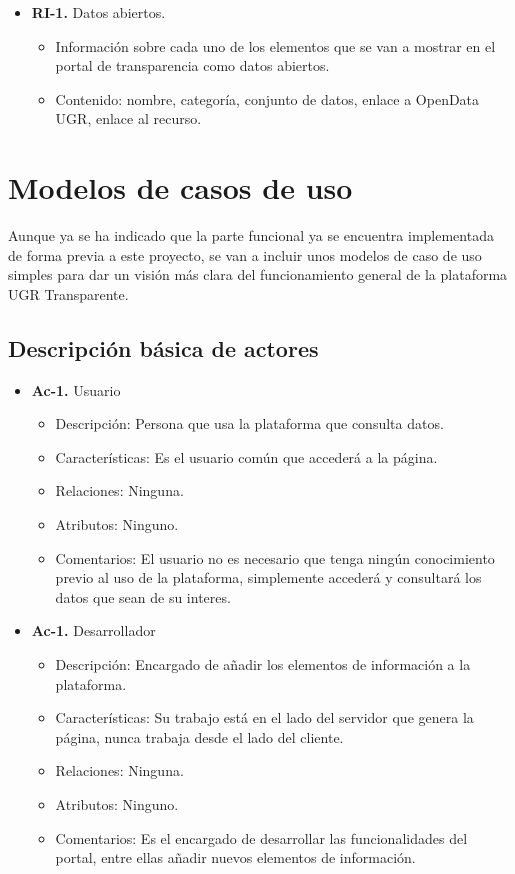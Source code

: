\begin{itemize}
  \item \textbf{RI-1.} Datos abiertos.
  \begin{itemize}
    \item Información sobre cada uno de los elementos que se van a mostrar en el portal de transparencia como datos abiertos.
    \item Contenido: nombre, categoría, conjunto de datos, enlace a OpenData UGR, enlace al recurso.
  \end{itemize}
\end{itemize}

\section{Modelos de casos de uso}

Aunque ya se ha indicado que la parte funcional ya se encuentra implementada de forma previa a este proyecto, se van a incluir
unos modelos de caso de uso simples para dar un visión más clara del funcionamiento general de la plataforma UGR Transparente.

\newpage
\subsection{Descripción básica de actores}

\begin{itemize}
  \item \textbf{Ac-1.} Usuario
  \begin{itemize}
   \item Descripción: Persona que usa la plataforma que consulta datos.
   \item Características: Es el usuario común que accederá a la página.
   \item Relaciones: Ninguna.
   \item Atributos: Ninguno.
   \item Comentarios: El usuario no es necesario que tenga ningún conocimiento previo al uso de la plataforma, simplemente
   accederá y consultará los datos que sean de su interes.
  \end{itemize}
  
  \item \textbf{Ac-1.} Desarrollador
  \begin{itemize}
   \item Descripción: Encargado de añadir los elementos de información a la plataforma.
   \item Características: Su trabajo está en el lado del servidor que genera la página, nunca trabaja desde el lado del cliente.
   \item Relaciones: Ninguna.
   \item Atributos: Ninguno.
   \item Comentarios: Es el encargado de desarrollar las funcionalidades del portal, entre ellas añadir nuevos elementos de
   información.
  \end{itemize}
\end{itemize}

